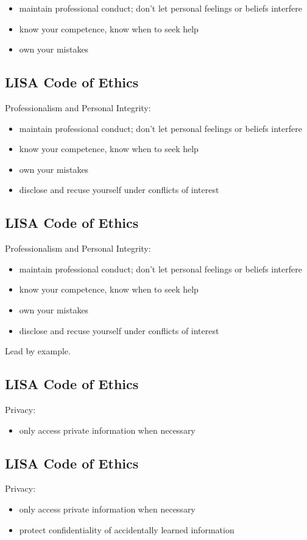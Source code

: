 \documentclass[xga]{xdvislides}
\begin{document}
\begin{itemize}
	\item maintain professional conduct; don't let
personal feelings or beliefs interfere
	\item know your competence, know when to seek help
	\item own your mistakes
\end{itemize}

\subsection{LISA Code of Ethics}
Professionalism and Personal Integrity:

\begin{itemize}
	\item maintain professional conduct; don't let
personal feelings or beliefs interfere
	\item know your competence, know when to seek help
	\item own your mistakes
	\item disclose and recuse yourself under conflicts of interest
\end{itemize}

\subsection{LISA Code of Ethics}
Professionalism and Personal Integrity:

\begin{itemize}
	\item maintain professional conduct; don't let
personal feelings or beliefs interfere
	\item know your competence, know when to seek help
	\item own your mistakes
	\item disclose and recuse yourself under conflicts of interest
\end{itemize}
\vspace{.5in}
Lead by example.

\subsection{LISA Code of Ethics}
Privacy:
\begin{itemize}
	\item only access private information when necessary
\end{itemize}

\subsection{LISA Code of Ethics}
Privacy:
\begin{itemize}
	\item only access private information when necessary
	\item protect confidentiality of accidentally learned information
\end{itemize}
\end{document}
